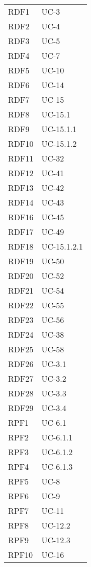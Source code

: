 \begin{longtable}{| p{5cm} | p{5cm} |}
		RDF1 & UC-3\\
		RDF2 & UC-4\\
		\rowcolor{LightGray}
		RDF3 & UC-5\\
		RDF4 & UC-7\\
		\rowcolor{LightGray}
		RDF5 & UC-10\\
		RDF6 & UC-14\\
		\rowcolor{LightGray}
		RDF7 & UC-15\\
		RDF8 & UC-15.1\\
		\rowcolor{LightGray}
		RDF9 & UC-15.1.1\\
		RDF10 & UC-15.1.2\\
		\rowcolor{LightGray}
		RDF11 & UC-32\\
		RDF12 & UC-41\\
		\rowcolor{LightGray}
		RDF13 & UC-42\\
		RDF14 & UC-43\\
		\rowcolor{LightGray}
		RDF16 & UC-45\\
		RDF17 & UC-49 \\
		\rowcolor{LightGray}
		RDF18 & UC-15.1.2.1 \\
		RDF19 & UC-50 \\
		\rowcolor{LightGray}
		RDF20 & UC-52 \\
		RDF21 & UC-54 \\
		\rowcolor{LightGray}
		RDF22 & UC-55 \\
		RDF23 & UC-56 \\
		\rowcolor{LightGray}
		RDF24 & UC-38\\
		RDF25 & UC-58\\
		\rowcolor{LightGray}
		RDF26 & UC-3.1\\
		RDF27 & UC-3.2\\
		\rowcolor{LightGray}
		RDF28 & UC-3.3\\
		RDF29 & UC-3.4\\
		\rowcolor{LightGray}
		RPF1 & UC-6.1\\
		RPF2 & UC-6.1.1\\
		\rowcolor{LightGray}
		RPF3 & UC-6.1.2\\
		RPF4 & UC-6.1.3\\
		\rowcolor{LightGray}
		RPF5 & UC-8\\
		RPF6 & UC-9\\
		\rowcolor{LightGray}
		RPF7 & UC-11\\
		RPF8 & UC-12.2\\
		\rowcolor{LightGray}
		RPF9 & UC-12.3\\
		RPF10 & UC-16\\

\end{longtable}
